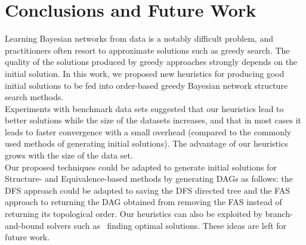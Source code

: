 \section{Conclusions and Future Work}
\label{sec:conclusions}

Learning Bayesian networks from data is a notably difficult problem, and practitioners often resort to approximate solutions such as greedy search. The quality of the solutions produced by greedy approaches strongly depends on the initial solution. In this work, we proposed new heuristics for producing good initial solutions to be fed into order-based greedy Bayesian network structure search methods.\\
Experiments with benchmark data sets suggested that our heuristics lead to better solutions while the size of the datasets increases, and that in most cases it leads to faster convergence with a small overhead (compared to the commonly used methods of generating initial solutions). The advantage of our heuristics grows with the size of the data set.\\
Our proposed techniques could be adapted to generate initial solutions for Structure- and Equivalence-based methods by generating DAGs as follows: the DFS approach could be adapted to saving the DFS directed tree and the FAS approach to returning the DAG obtained from removing the FAS instead of returning its topological order. Our heuristics can also be exploited by branch-and-bound solvers such as~\cite{Cassio11} finding optimal solutions. These ideas are left for future work.
\vspace{-4mm}